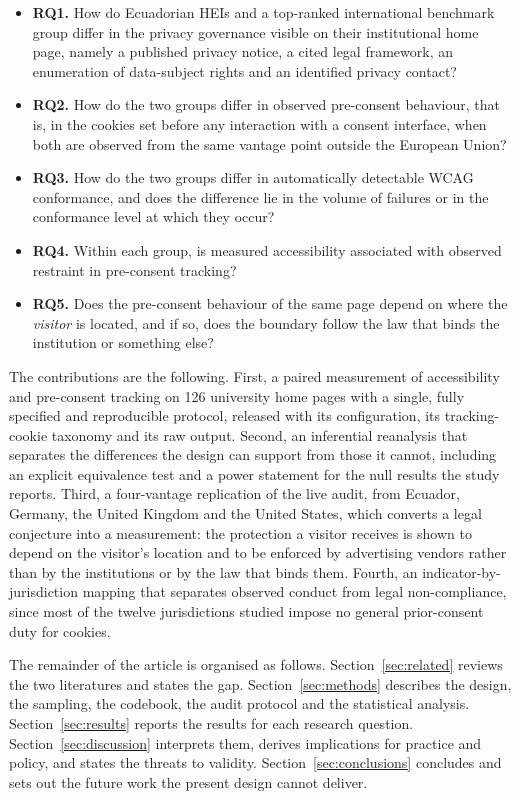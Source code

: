 \documentclass[pdflatex,sn-basic,Numbered,iicol]{sn-jnl}
\theoremstyle{thmstyleone}
\theoremstyle{thmstyletwo}
\theoremstyle{thmstylethree}
\begin{document}
\begin{itemize}
	\item \textbf{RQ1.} How do Ecuadorian HEIs and a top-ranked international benchmark group differ in the privacy governance visible on their institutional home page, namely a published privacy notice, a cited legal framework, an enumeration of data-subject rights and an identified privacy contact?
	\item \textbf{RQ2.} How do the two groups differ in observed pre-consent behaviour, that is, in the cookies set before any interaction with a consent interface, when both are observed from the same vantage point outside the European Union?
	\item \textbf{RQ3.} How do the two groups differ in automatically detectable WCAG conformance, and does the difference lie in the volume of failures or in the conformance level at which they occur?
	\item \textbf{RQ4.} Within each group, is measured accessibility associated with observed restraint in pre-consent tracking?
	\item \textbf{RQ5.} Does the pre-consent behaviour of the same page depend on where the \emph{visitor} is located, and if so, does the boundary follow the law that binds the institution or something else?
\end{itemize}

The contributions are the following. First, a paired measurement of accessibility and pre-consent tracking on 126 university home pages with a single, fully specified and reproducible protocol, released with its configuration, its tracking-cookie taxonomy and its raw output. Second, an inferential reanalysis that separates the differences the design can support from those it cannot, including an explicit equivalence test and a power statement for the null results the study reports. Third, a four-vantage replication of the live audit, from Ecuador, Germany, the United Kingdom and the United States, which converts a legal conjecture into a measurement: the protection a visitor receives is shown to depend on the visitor's location and to be enforced by advertising vendors rather than by the institutions or by the law that binds them. Fourth, an indicator-by-jurisdiction mapping that separates observed conduct from legal non-compliance, since most of the twelve jurisdictions studied impose no general prior-consent duty for cookies.

The remainder of the article is organised as follows. Section~\ref{sec:related} reviews the two literatures and states the gap. Section~\ref{sec:methods} describes the design, the sampling, the codebook, the audit protocol and the statistical analysis. Section~\ref{sec:results} reports the results for each research question. Section~\ref{sec:discussion} interprets them, derives implications for practice and policy, and states the threats to validity. Section~\ref{sec:conclusions} concludes and sets out the future work the present design cannot deliver.
\end{document}
